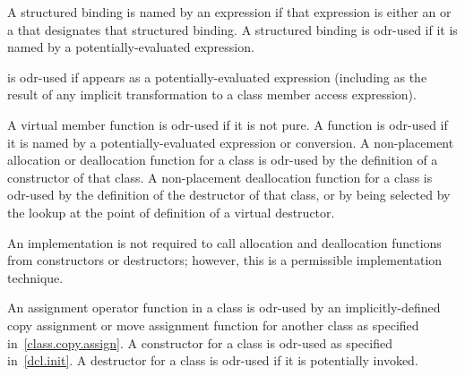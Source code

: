 \pnum
A structured binding is named by an expression
if that expression is either an  or
a 
that designates that structured binding.
A structured binding is odr-used
if it is named by a potentially-evaluated expression.

\pnum
{} is odr-used if  appears as a potentially-evaluated expression
(including as the result of any implicit transformation to
a class member access expression).

\pnum
A virtual member
function is odr-used if it is not pure.
A function is odr-used if it is named by
a potentially-evaluated expression or conversion.
A non-placement allocation or deallocation
function for a class is odr-used by the definition of a constructor of that
class. A non-placement deallocation function for a class is odr-used by the
definition of the destructor of that class, or by being selected by the
lookup at the point of definition of a virtual
destructor.
\begin{footnote}
An implementation is not required
to call allocation and
deallocation functions from constructors or destructors; however, this
is a permissible implementation technique.
\end{footnote}

\pnum
An assignment operator function in a class is odr-used by an
implicitly-defined
copy assignment or move assignment function for another class as specified
in~\ref{class.copy.assign}.
A constructor for a class is odr-used as specified
in~\ref{dcl.init}. A destructor for a class is odr-used if it is potentially
invoked.

